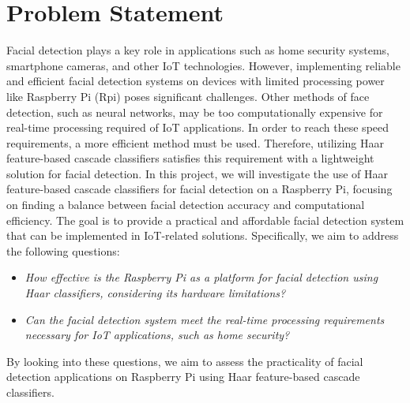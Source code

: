 \documentclass[conference]{IEEEtran}
\begin{document}
\section{Problem Statement}

Facial detection plays a key role in applications such as home security systems, smartphone cameras, and other IoT technologies. However, implementing reliable and efficient facial detection systems on devices with limited processing power like Raspberry Pi (Rpi) poses significant challenges. Other methods of face detection, such as neural networks, may be too computationally expensive for real-time processing required of IoT applications. In order to reach these speed requirements, a more efficient method must be used. Therefore, utilizing Haar feature-based cascade classifiers satisfies this requirement with a lightweight solution for facial detection.
In this project, we will investigate the use of Haar feature-based cascade classifiers for facial detection on a Raspberry Pi, focusing on finding a balance between facial detection accuracy and computational efficiency. The goal is to provide a practical and affordable facial detection system that can be implemented  in IoT-related solutions. Specifically, we aim to address the following questions:
\begin{itemize}
\item{\emph{How effective is the Raspberry Pi as a platform for facial detection using Haar classifiers, considering its hardware limitations?}}
\item{\emph{Can the facial detection system meet the real-time processing requirements necessary for IoT applications, such as home security?}}
\end{itemize}
By looking into these questions, we aim to assess the practicality of facial detection applications on Raspberry Pi using Haar feature-based cascade classifiers.
\end{document}

